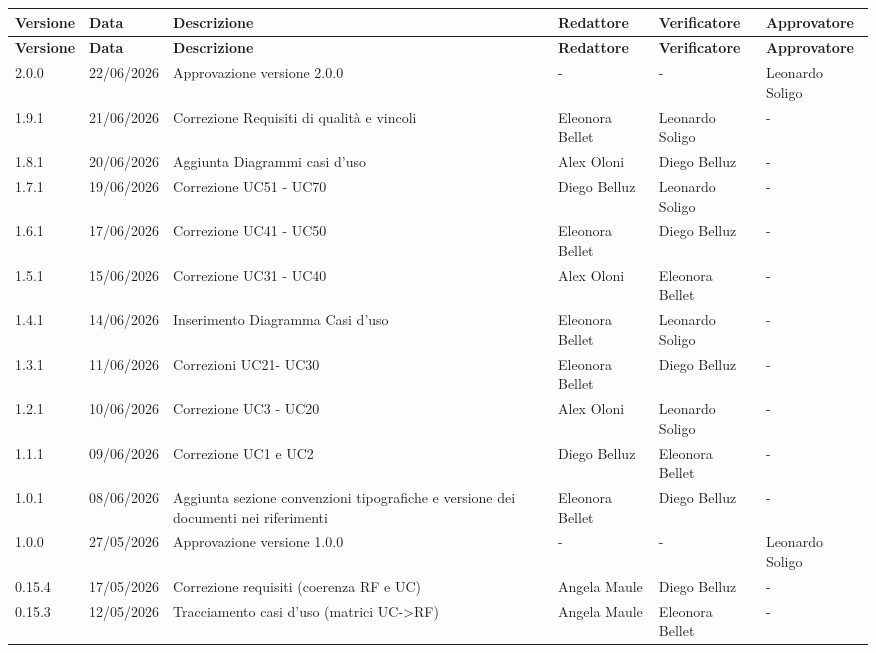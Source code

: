 ﻿\documentclass[a4paper,12pt]{article}
\begin{document}
\renewcommand{\arraystretch}{1.35}
{\small
\setlength{\LTleft}{0pt}
\setlength{\LTright}{0pt}
\begin{longtable}{|p{1.2cm}|p{1.9cm}|p{4.3cm}|p{2.8cm}|p{2.1cm}|p{2.1cm}|}
    \hline
    \rowcolor{gray!20}
    \textbf{Versione} & \textbf{Data} & \textbf{Descrizione} & \textbf{Redattore} & \textbf{Verificatore} & \textbf{Approvatore} \\
    \hline
    \endfirsthead
    \hline
    \rowcolor{gray!20}
    \textbf{Versione} & \textbf{Data} & \textbf{Descrizione} & \textbf{Redattore} & \textbf{Verificatore} & \textbf{Approvatore} \\
    \hline
    \endhead
    2.0.0 & 22/06/2026 & Approvazione versione 2.0.0 & - & - & Leonardo Soligo \\
    \hline
    1.9.1 & 21/06/2026 & Correzione Requisiti di qualità e vincoli & Eleonora Bellet & Leonardo Soligo & - \\
    \hline 
    1.8.1 & 20/06/2026 & Aggiunta Diagrammi casi d'uso & Alex Oloni & Diego Belluz & - \\
    \hline
    1.7.1 & 19/06/2026 & Correzione UC51 - UC70 & Diego Belluz & Leonardo Soligo & - \\
    \hline
    1.6.1 & 17/06/2026 & Correzione UC41 - UC50 & Eleonora Bellet & Diego Belluz & - \\
    \hline
    1.5.1 & 15/06/2026 & Correzione UC31 - UC40 & Alex Oloni & Eleonora Bellet & - \\
    \hline 
    1.4.1 & 14/06/2026 & Inserimento Diagramma Casi d'uso & Eleonora Bellet & Leonardo Soligo & - \\
    \hline 
    1.3.1 & 11/06/2026 & Correzioni UC21- UC30 & Eleonora Bellet & Diego Belluz & - \\
    \hline
    1.2.1 & 10/06/2026 & Correzione UC3 - UC20 & Alex Oloni & Leonardo Soligo & - \\
    \hline
    1.1.1 & 09/06/2026 & Correzione UC1 e UC2 & Diego Belluz & Eleonora Bellet & - \\
    \hline
    1.0.1 & 08/06/2026 & Aggiunta sezione convenzioni tipografiche e versione dei documenti nei riferimenti & Eleonora Bellet & Diego Belluz & - \\
    \hline
    1.0.0 & 27/05/2026 & Approvazione versione 1.0.0 & - & - & Leonardo Soligo \\
    \hline
    \rowcolor{gray!8} 0.15.4 & 17/05/2026 & Correzione requisiti (coerenza RF e UC) & Angela Maule & Diego Belluz & - \\
    \hline
    0.15.3 & 12/05/2026 & Tracciamento casi d'uso (matrici UC->RF) & Angela Maule & Eleonora Bellet & - \\

\end{longtable}}
\end{document}
